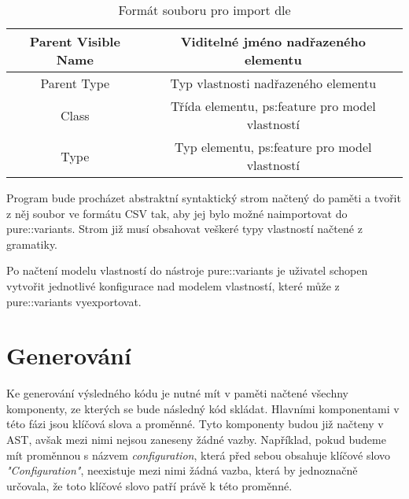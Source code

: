 \begin{table}[H]
{\begin{tabular}{|c|c|}
\hline
Parent Visible Name & Viditelné jméno nadřazeného elementu                                                                                                                                                                                                                                                              \\ 
\hline
Parent Type         & Typ vlastnosti nadřazeného elementu                                                                                                                                                                                                                                                               \\ 
\hline
Class               & Třída elementu, ps:feature pro model vlastností                                                                                                                                                                                                                                                   \\ 
\hline
Type                & Typ elementu, ps:feature pro model vlastností                                                                                                                                                                                                                                                     \\
\hline
\end{tabular}}
\caption{Formát souboru pro import dle \cite{Pure13}}
\end{table}

Program bude procházet abstraktní syntaktický strom načtený do paměti a tvořit z něj soubor ve formátu CSV tak, aby jej bylo možné naimportovat do pure::variants. Strom již musí obsahovat veškeré typy vlastností načtené z gramatiky.

Po načtení modelu vlastností do nástroje pure::variants je uživatel schopen vytvořit jednotlivé konfigurace nad modelem vlastností, které může z pure::variants vyexportovat. 

\section{Generování}

Ke generování výsledného kódu je nutné mít v paměti načtené všechny komponenty, ze kterých se bude následný kód skládat. Hlavními komponentami v této fázi jsou klíčová slova a proměnné. Tyto komponenty budou již načteny v AST, avšak mezi nimi nejsou zaneseny žádné vazby. Například, pokud budeme mít proměnnou s názvem \textit{configuration}, která před sebou obsahuje klíčové slovo \textit{"Configuration"}, neexistuje mezi nimi žádná vazba, která by jednoznačně určovala, že toto klíčové slovo patří právě k této proměnné.

